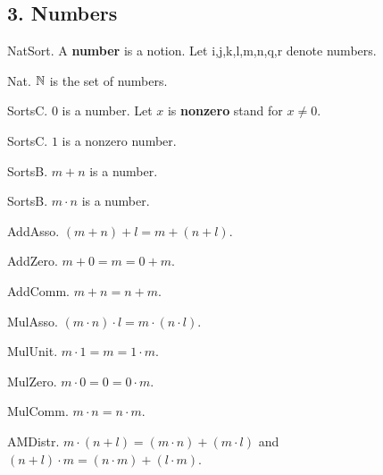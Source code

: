 \subsection{3. Numbers}


\begin{signature} NatSort.
A {\bf number} is a notion.
Let i,j,k,l,m,n,q,r denote numbers.
\end{signature}

\begin{definition} Nat.
${\Bbb N}$ is the set of numbers.
\end{definition}

\begin{signature} SortsC.  
$0$ is a number.
Let $x$ is {\bf nonzero} stand for $x \neq 0$.
\end{signature}

\begin{signature} SortsC.
$1$ is a nonzero number.
\end{signature}

\begin{signature} SortsB.
$m + n$ is a number.
\end{signature}

\begin{signature} SortsB.
$m \cdot n$ is a number.
\end{signature}

\begin{axiom} AddAsso. $(m + n) + l = m + (n + l)$.\end{axiom}
\begin{axiom} AddZero.  $m + 0 = m = 0 + m$. \end{axiom}
\begin{axiom} AddComm.   $m + n = n + m$. \end{axiom}

\begin{axiom} MulAsso.  
$(m \cdot n) \cdot l = m \cdot (n \cdot l)$.
\end{axiom}
\begin{axiom} MulUnit.  $m \cdot 1 = m = 1 \cdot m$.\end{axiom}
\begin{axiom} MulZero.  $m \cdot 0 = 0 = 0 \cdot m$.\end{axiom}
\begin{axiom} MulComm.  $m \cdot n = n \cdot m$.\end{axiom}

\begin{axiom} AMDistr.  
$m \cdot (n + l) = (m \cdot n) + (m \cdot l)$ and
$(n + l) \cdot m = (n \cdot m) + (l \cdot m)$.\end{axiom}


